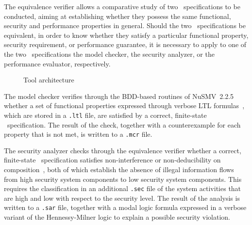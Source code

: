 The equivalence verifier allows a comparative study of two \aemilia\ specifications to be conducted, aiming
at establishing whether they possess the same functional, security and performance properties in general.
Should the two \aemilia\ specifications be equivalent, in order to know whether they satisfy a particular
functional property, security requirement, or performance guarantee, it is necessary to apply to one of the
two \aemilia\ specifications the model checker, the security analyzer, or the performance evaluator,
respectively.

	\begin{figure}[thb]

\centerline{}
\caption{Tool architecture}\label{archi}

	\end{figure}

The model checker verifies through the BDD-based routines of NuSMV~2.2.5~\cite{CCOPR} whether a set of
functional properties expressed through verbose LTL formulas~\cite{CGP}, which are stored in a {\tt .ltl}
file, are satisfied by a correct, finite-state \aemilia\ specification. The result of the check, together
with a counterexample for each property that is not met, is written to a {\tt .mcr} file.

The security analyzer checks through the equivalence verifier whether a correct, finite-state \aemilia\
specification satisfies non-interference or non-deducibility on composition~\cite{FG}, both of which
establish the absence of illegal information flows from high security system components to low security
system components. This requires the classification in an additional {\tt .sec} file of the system
activities that are high and low with respect to the security level. The result of the analysis is written
to a {\tt .sar} file, together with a modal logic formula expressed in a verbose variant of the
Hennessy-Milner logic to explain a possible security violation.

